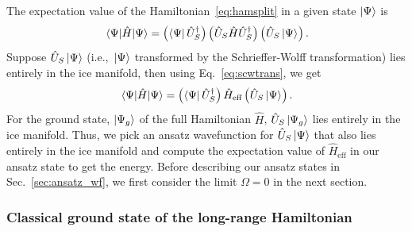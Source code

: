 \documentclass[twocolumn,superscriptaddress,amsmath,amssymb,aps,prx,nofootinbib]{revtex4-2}
\begin{document}
The expectation value of the Hamiltonian~\eqref{eq:hamsplit} in a given state $\ket{\Psi}$ is 
\begin{equation}
    \mel{\Psi}{\hat{H}}{\Psi}=\left(\bra{\Psi}\hat{U}_S^\dagger\right)\left(\hat{U}_S \hat{H} \hat{U}_S^\dagger \right)\left(\hat{U}_S \ket{\Psi} \right).
\end{equation}
Suppose $\hat{U}_S \ket{\Psi} $ (i.e.,~$\ket{\Psi}$ transformed by the Schrieffer-Wolff transformation) lies entirely in the ice manifold, then using Eq.~\eqref{eq:scwtrans}, we get
\begin{equation}
    \mel{\Psi}{\hat{H}}{\Psi}= \left(\bra{\Psi}\hat{U}_S^\dagger\right) \hat{H}_{\text{eff}}\left(\hat{U}_S \ket{\Psi} \right).
\end{equation}
For the ground state, $\ket{\Psi_g}$ of the full Hamiltonian $\hat{H}$, $\hat{U}_S \ket{\Psi_g}$ lies entirely in the ice manifold. Thus, we pick an ansatz wavefunction for $\hat{U}_S \ket{\Psi}$ that also lies entirely in the ice manifold and compute the expectation value of $\hat{H}_{\text{eff}}$ in our ansatz state to get the energy. Before describing our ansatz states in Sec.~\ref{sec:ansatz_wf}, we first consider the limit $\Omega=0$ in the next section.




\subsubsection{Classical ground state of the long-range Hamiltonian}\label{sec:classical}
\end{document}
